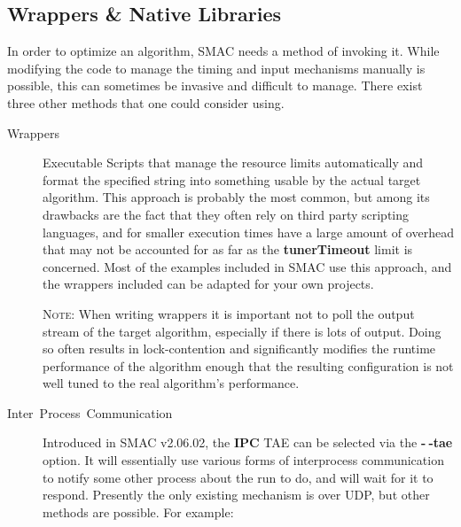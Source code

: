 \documentclass[manual.tex]{subfiles}
\begin{document}
\subsection{Wrappers \& Native Libraries}
\label{sec:exec-options}
In order to optimize an algorithm, SMAC needs a method of invoking it. While modifying the code
to manage the timing and input mechanisms manually is possible, this can sometimes be invasive and difficult to manage. There exist three other methods that one could consider using.

\begin{description}
\item [{Wrappers}] Executable Scripts that manage the resource limits automatically
and format the specified string into something usable by the actual
target algorithm. This approach is probably the most common, but among
its drawbacks are the fact that they often rely on third party scripting languages,
and for smaller execution times have a large amount of overhead that
may not be accounted for as far as the \textbf{tunerTimeout} limit is concerned. Most of the examples included in SMAC use this approach, and the wrappers included can be adapted for your own
projects.

\textsc{Note:} When writing wrappers it is important not to poll the output stream of the target algorithm, especially if there is lots of output. Doing so often results in lock-contention and significantly modifies the runtime performance of the algorithm enough that the resulting configuration is not well tuned to the real algorithm's performance.


\item [Inter~Process~Communication] Introduced in SMAC v2.06.02, the \textbf{IPC} TAE can be selected via the \textbf{-$~\!$-tae} option. It will essentially use various forms of interprocess communication to notify some other process about the run to do, and will wait for it to respond. Presently the only existing mechanism is over UDP, but other methods are possible. For example:


\end{description}
\end{document}
